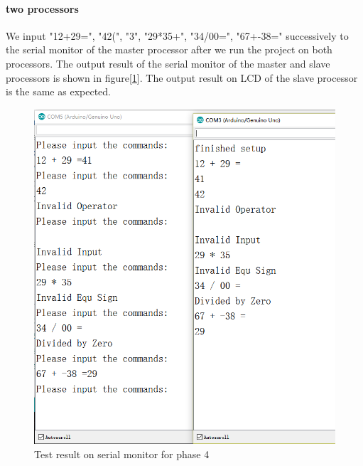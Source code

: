 \paragraph{two processors}
We input "12+29=", "42(", "3", "29*35+", "34/00=", "67+-38=" successively to the serial monitor of the master processor after we run the project on both processors. The output result of the serial monitor of the master and slave processors is shown in figure[\ref{fig:test4}]. The output result on LCD of the slave processor is the same as expected.
\begin{figure}[!htbp]
	\centering
	\includegraphics[width = \linewidth]{images/test4.png}
	\caption{Test result on serial monitor for phase 4}
	\label{fig:test4}
\end{figure}

